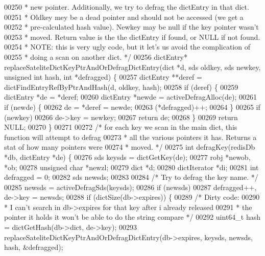\begin{DoxyCode}
00250 \textcolor{comment}{ * new pointer. Additionally, we try to defrag the dictEntry in that dict.}
00251 \textcolor{comment}{ * Oldkey mey be a dead pointer and should not be accessed (we get a}
00252 \textcolor{comment}{ * pre-calculated hash value). Newkey may be null if the key pointer wasn't}
00253 \textcolor{comment}{ * moved. Return value is the the dictEntry if found, or NULL if not found.}
00254 \textcolor{comment}{ * NOTE: this is very ugly code, but it let's us avoid the complication of}
00255 \textcolor{comment}{ * doing a scan on another dict. */}
00256 dictEntry* replaceSateliteDictKeyPtrAndOrDefragDictEntry(dict *d, sds oldkey, sds newkey, \textcolor{keywordtype}{unsigned} \textcolor{keywordtype}{int}
       hash, \textcolor{keywordtype}{int} *defragged) \{
00257     dictEntry **deref = dictFindEntryRefByPtrAndHash(d, oldkey, hash);
00258     \textcolor{keywordflow}{if} (deref) \{
00259         dictEntry *de = *deref;
00260         dictEntry *newde = activeDefragAlloc(de);
00261         \textcolor{keywordflow}{if} (newde) \{
00262             de = *deref = newde;
00263             (*defragged)++;
00264         \}
00265         \textcolor{keywordflow}{if} (newkey)
00266             de->key = newkey;
00267         \textcolor{keywordflow}{return} de;
00268     \}
00269     \textcolor{keywordflow}{return} NULL;
00270 \}
00271 
00272 \textcolor{comment}{/* for each key we scan in the main dict, this function will attempt to defrag}
00273 \textcolor{comment}{ * all the various pointers it has. Returns a stat of how many pointers were}
00274 \textcolor{comment}{ * moved. */}
00275 \textcolor{keywordtype}{int} defragKey(redisDb *db, dictEntry *de) \{
00276     sds keysds = dictGetKey(de);
00277     robj *newob, *ob;
00278     \textcolor{keywordtype}{unsigned} \textcolor{keywordtype}{char} *newzl;
00279     dict *d;
00280     dictIterator *di;
00281     \textcolor{keywordtype}{int} defragged = 0;
00282     sds newsds;
00283 
00284     \textcolor{comment}{/* Try to defrag the key name. */}
00285     newsds = activeDefragSds(keysds);
00286     \textcolor{keywordflow}{if} (newsds)
00287         defragged++, de->key = newsds;
00288     \textcolor{keywordflow}{if} (dictSize(db->expires)) \{
00289          \textcolor{comment}{/* Dirty code:}
00290 \textcolor{comment}{          * I can't search in db->expires for that key after i already released}
00291 \textcolor{comment}{          * the pointer it holds it won't be able to do the string compare */}
00292         uint64\_t hash = dictGetHash(db->dict, de->key);
00293         replaceSateliteDictKeyPtrAndOrDefragDictEntry(db->expires, keysds, newsds, hash, &defragged);

\end{DoxyCode}
